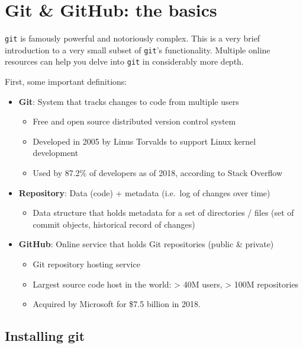 \documentclass[
]{book}
\providecommand{\tightlist}{%
  \setlength{\itemsep}{0pt}\setlength{\parskip}{0pt}}
\begin{document}
\hypertarget{git}{%
\chapter{Git \& GitHub: the basics}\label{git}}

\texttt{git} is famously powerful and notoriously complex. This is a very brief introduction to a very small subset of \texttt{git}'s functionality. Multiple online resources can help you delve into \texttt{git} in considerably more depth.

First, some important definitions:

\begin{itemize}
\tightlist
\item
  \textbf{Git}: System that tracks changes to code from multiple users

  \begin{itemize}
  \tightlist
  \item
    Free and open source distributed version control system
  \item
    Developed in 2005 by Linus Torvalds to support Linux kernel development
  \item
    Used by 87.2\% of developers as of 2018, according to Stack Overflow
  \end{itemize}
\item
  \textbf{Repository}: Data (code) + metadata (i.e.~log of changes over time)

  \begin{itemize}
  \tightlist
  \item
    Data structure that holds metadata for a set of directories / files (set of commit objects, historical record of changes)
  \end{itemize}
\item
  \textbf{GitHub}: Online service that holds Git repositories (public \& private)

  \begin{itemize}
  \tightlist
  \item
    Git repository hosting service
  \item
    Largest source code host in the world: \textgreater{} 40M users, \textgreater{} 100M repositories
  \item
    Acquired by Microsoft for \$7.5 billion in 2018.
  \end{itemize}
\end{itemize}

\hypertarget{installing-git}{%
\section{Installing git}\label{installing-git}}
\end{document}
